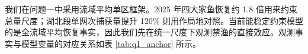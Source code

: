我们在问题一中采用流域平均单区框架。2025 年四大家鱼恢复约 1.8 倍用来约束总量尺度；湖北段单网次捕获量提升 120\% 则用作局地对照。当前能稳定约束模型的是全流域平均恢复事实，因此我们先在统一尺度下观测禁渔的直接效应。观测事实与模型变量的对应关系如表 \ref{tab:q1_anchor} 所示。
